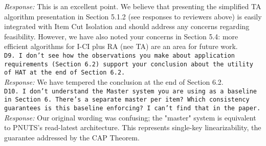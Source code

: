 \documentclass[10pt]{article}
\newcommand{\reviewer}[1] {\noindent\texttt{#1}\\}
\newcommand{\response}[1] {\noindent\textit{Response: } #1\\}
\begin{document}
\response{This is an excellent point. We believe that presenting the simplified
TA algorithm presentation in Section 5.1.2 (see responses to reviewers
above) is easily integrated with Item Cut Isolation and should address
any concerns regarding feasibility. However, we have also noted your
concerns in Section 5.4: more efficient algorithms for I-CI plus RA
(nee TA) are an area for future work.}

\reviewer{D9. I don't see how the observations you make about application requirements 
(Section 6.2) support your conclusion about the utility of HAT at the end 
 of Section 6.2. }

\response{We have tempered the conclusion at the end of Section 6.2.}

\reviewer{D10. I don't understand the Master system you are using as a baseline in Section 6. There's a separate master per item? Which consistency guarantees is this baseline enforcing? I can't find that in the paper.}

\response{Our original wording was confusing; the "master" system is equivalent
to PNUTS's read-latest architecture. This represents single-key
linearizability, the guarantee addressed by the CAP Theorem.}
\end{document}

